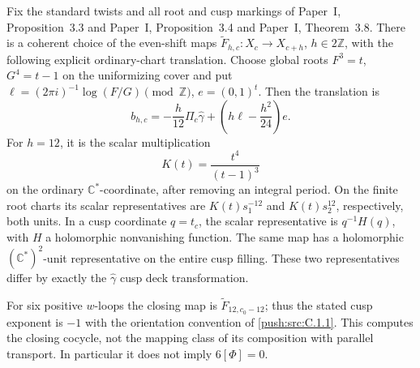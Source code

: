 \begin{proposition}\label{push:src:C.3.5}
Fix the standard twists and all root and cusp markings of Paper~I, Proposition~3.3 and Paper~I, Proposition~3.4 and Paper~I, Theorem~3.8.
There is a coherent choice of the even-shift maps
\(\widetilde F_{h,c}:X_c\to X_{c+h}\), \(h\in2\mathbb Z\),
with the following explicit ordinary-chart translation. Choose global
roots \(F^3=t\), \(G^4=t-1\) on the uniformizing cover and put
\(\ell=(2\pi i)^{-1}\log(F/G)\pmod{\mathbb Z}\), \(e=(0,1)^t\).
Then the translation is
\begin{equation}\label{mapsI:closing:eq:C-explicit-closing}
 b_{h,c}=-\frac h{12}\Pi_c\widehat\gamma
              +\left(h\ell-\frac{h^2}{24}\right)e.
\end{equation}
For \(h=12\), it is the scalar multiplication
\begin{equation}\label{mapsI:closing:eq:C-twelve-scalar}
 K(t)=\frac{t^4}{(t-1)^3}
\end{equation}
on the ordinary \(\mathbb C^*\)-coordinate, after removing an integral
period. On the finite root charts its scalar representatives are
\(K(t)s_1^{-12}\) and \(K(t)s_2^{12}\), respectively, both units.
In a cusp coordinate \(q=t_c\), the scalar representative is
\(q^{-1}H(q)\), with \(H\) a holomorphic nonvanishing function.
The same map has a holomorphic \((\mathbb C^*)^2\)-unit representative
on the entire cusp filling. These two representatives differ by
exactly the \(\widehat\gamma\) cusp deck transformation.

For six positive \(w\)-loops the closing map is
\(\widetilde F_{12,c_0-12}\); thus the stated cusp exponent is \(-1\)
with the orientation convention of \ref{push:src:C.1.1}. This computes the closing
cocycle, not the mapping class of its composition with parallel
transport. In particular it does not imply \(6[\Phi]=0\).
\end{proposition}
